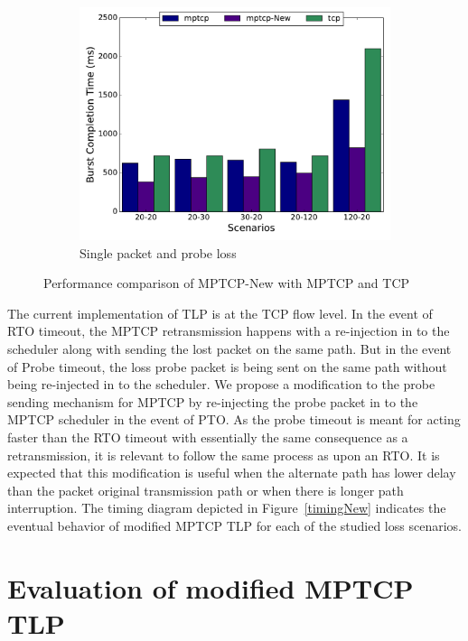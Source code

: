 \documentclass[10pt,conference]{IEEEtran}
\begin{document}
\begin{figure}
\begin{subfigure}[b]{0.32\textwidth}
\includegraphics[angle=0, width=\textwidth, natwidth=578.16,natheight=433.62]{plots/1PPNew.pdf}
\caption{Single packet and probe loss}\label{1ppn}
\end{subfigure}
\caption{Performance comparison of MPTCP-New with MPTCP and TCP}\label{mpnew}
\end{figure}

The current implementation of TLP is at the TCP flow level. In the event of RTO timeout, the MPTCP retransmission happens with a re-injection in 
to the scheduler along with sending the lost packet on the same path. But in the event of Probe timeout, the loss probe packet is being sent on 
the same path without being re-injected in to the scheduler. We propose a modification to the probe sending mechanism for MPTCP by re-injecting 
the probe packet in to the MPTCP scheduler in the event of PTO. As the probe timeout is meant for acting faster than the RTO timeout with 
essentially the same consequence as a retransmission, it is relevant to follow the same process as upon an RTO. It is expected that this 
modification is useful when the alternate path has lower delay than the packet original transmission path or when there is longer path 
interruption. The timing diagram depicted in Figure~\ref{timingNew} indicates the eventual behavior of modified MPTCP TLP for each of the studied 
loss scenarios.





\section{Evaluation of modified MPTCP TLP}\label{eval}
\end{document}
